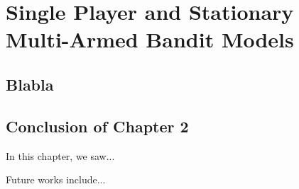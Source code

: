 
\chapter{Single Player and Stationary Multi-Armed Bandit Models}
\label{chapter:2}
\minitoc
\newpage
\graphicspath{{2-Chapters/2-Chapter/Images/}}

\section{Blabla}
\label{sec:blabla}


\section{Conclusion of Chapter 2}
\label{sec:2:conclusion}

In this chapter, we saw...

Future works include...



